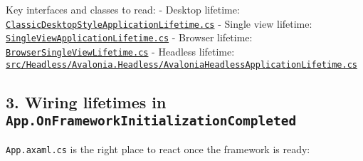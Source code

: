 Key interfaces and classes to read: - Desktop lifetime:
\href{https://github.com/AvaloniaUI/Avalonia/blob/master/src/Avalonia.Controls/ApplicationLifetimes/ClassicDesktopStyleApplicationLifetime.cs}{\passthrough{\lstinline!ClassicDesktopStyleApplicationLifetime.cs!}}
- Single view lifetime:
\href{https://github.com/AvaloniaUI/Avalonia/blob/master/src/Avalonia.Controls/ApplicationLifetimes/SingleViewApplicationLifetime.cs}{\passthrough{\lstinline!SingleViewApplicationLifetime.cs!}}
- Browser lifetime:
\href{https://github.com/AvaloniaUI/Avalonia/blob/master/src/Browser/Avalonia.Browser/BrowserSingleViewLifetime.cs}{\passthrough{\lstinline!BrowserSingleViewLifetime.cs!}}
- Headless lifetime:
\href{https://github.com/AvaloniaUI/Avalonia/blob/master/src/Headless/Avalonia.Headless/AvaloniaHeadlessApplicationLifetime.cs}{\passthrough{\lstinline!src/Headless/Avalonia.Headless/AvaloniaHeadlessApplicationLifetime.cs!}}

\subsection{\texorpdfstring{3. Wiring lifetimes in
\texttt{App.OnFrameworkInitializationCompleted}}{3. Wiring lifetimes in App.OnFrameworkInitializationCompleted}}\label{wiring-lifetimes-in-app.onframeworkinitializationcompleted}

\passthrough{\lstinline!App.axaml.cs!} is the right place to react once
the framework is ready:

